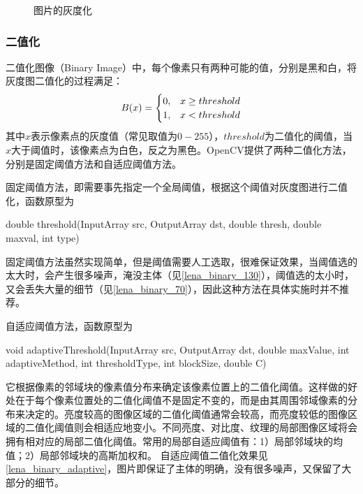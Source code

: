 \begin{figure}[htbp]
  \centering
	\hfill
  \caption{图片的灰度化}
  \label{pic:greyscale}
\end{figure}

\subsubsection*{二值化}
\label{sub:二值化}
二值化图像（Binary Image）中，每个像素只有两种可能的值，分别是黑和白，将灰度图二值化的过程满足\label{pic:binarization}：
\begin{equation} \label{pic:binarization}
	B(x)=
	\begin{cases}
		0,&x\geq threshold\cr 1,&x<threshold
	\end{cases}
\end{equation}
其中$x$表示像素点的灰度值（常见取值为$0-255$），$threshold$为二值化的阈值，当$x$大于阈值时，该像素点为白色，反之为黑色。OpenCV提供了两种二值化方法，分别是固定阈值方法和自适应阈值方法。

固定阈值方法，即需要事先指定一个全局阈值，根据这个阈值对灰度图进行二值化，函数原型为
\begin{Code}
double threshold(InputArray src, OutputArray dst, double thresh, double maxval, int type)
\end{Code}
固定阈值方法虽然实现简单，但是阈值需要人工选取，很难保证效果，当阈值选的太大时，会产生很多噪声，淹没主体（见\autoref{lena_binary_130}），阈值选的太小时，又会丢失大量的细节（见\autoref{lena_binary_70}），因此这种方法在具体实施时并不推荐。

自适应阈值方法，函数原型为
\begin{Code}
void adaptiveThreshold(InputArray src, OutputArray dst, double maxValue, int adaptiveMethod, int thresholdType, int blockSize, double C)
\end{Code}
它根据像素的邻域块的像素值分布来确定该像素位置上的二值化阈值。这样做的好处在于每个像素位置处的二值化阈值不是固定不变的，而是由其周围邻域像素的分布来决定的。亮度较高的图像区域的二值化阈值通常会较高，而亮度较低的图像区域的二值化阈值则会相适应地变小。不同亮度、对比度、纹理的局部图像区域将会拥有相对应的局部二值化阈值。常用的局部自适应阈值有：1）局部邻域块的均值；2）局部邻域块的高斯加权和。%
自适应阈值二值化效果见\autoref{lena_binary_adaptive}，图片即保证了主体的明确，没有很多噪声，又保留了大部分的细节。

